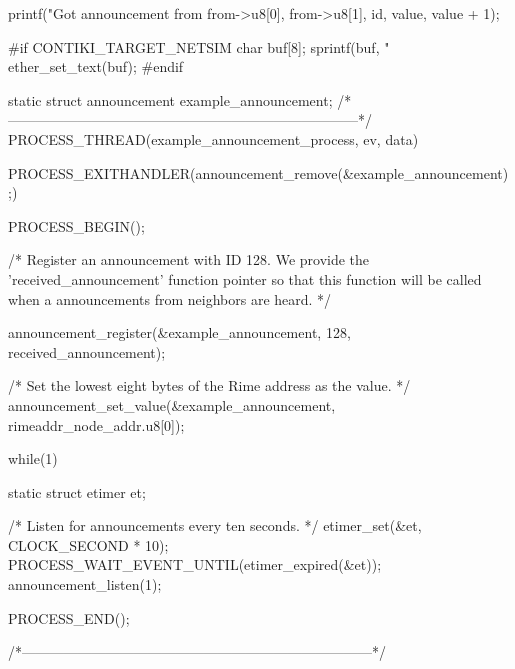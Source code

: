 \begin{DoxyCodeInclude}
{  printf("Got announcement from %
         from->u8[0], from->u8[1], id, value, value + 1);

#if CONTIKI_TARGET_NETSIM
  {
    char buf[8];
    sprintf(buf, "%
    ether_set_text(buf);
  }
#endif

}
static struct announcement example_announcement;
/*---------------------------------------------------------------------------*/
PROCESS_THREAD(example_announcement_process, ev, data)
{
  PROCESS_EXITHANDLER(announcement_remove(&example_announcement);)
    
  PROCESS_BEGIN();

  /* Register an announcement with ID 128. We provide the
     'received_announcement' function pointer so that this function
     will be called when a announcements from neighbors are heard. */

  announcement_register(&example_announcement,
                        128,
                        received_announcement);

  /* Set the lowest eight bytes of the Rime address as the value. */
  announcement_set_value(&example_announcement, rimeaddr_node_addr.u8[0]);

  while(1) {
    static struct etimer et;

    /* Listen for announcements every ten seconds. */
    etimer_set(&et, CLOCK_SECOND * 10);
    PROCESS_WAIT_EVENT_UNTIL(etimer_expired(&et));
    announcement_listen(1);
  }

  PROCESS_END();
}
/*---------------------------------------------------------------------------*/
\end{DoxyCodeInclude}
 